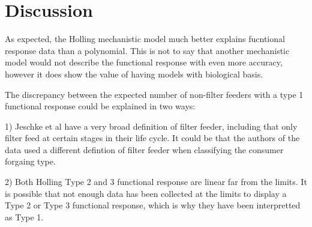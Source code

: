 \documentclass[11pt, a4paper, titlepage]{article}
\begin{document}
\section{Discussion}

As expected, the Holling mechanistic model much better explains fucntional response data than a polynomial. This is not to say that another mechanistic model would not describe the functional response with even more accuracy, however it does show the value of having models with biological basis.

The discrepancy between the expected number of non-filter feeders with a type 1 functional response could be explained in two ways:

1) Jeschke et al have a very broad definition of filter feeder, including that only filter feed at certain stages in their life cycle. It could be that the authors of the data used a different defintion of filter feeder when classifying the consumer forgaing type.

2) Both Holling Type 2 and 3 functional response are linear far from the limits. It is possible that not enough data has been collected at the limits to display a Type 2 or Type 3 functional response, which is why they have been interpretted as Type 1.

\newpage
\printbibliography
\newpage
\end{document}
